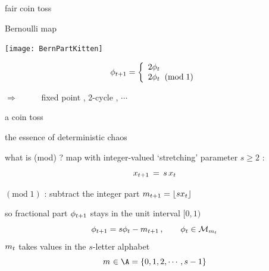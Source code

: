 \begin{frame}{fair coin toss} %
\renewcommand{\ssp}{\ensuremath{\phi}}             %
    \begin{block}{{Bernoulli}  map} %
\begin{center}
            \begin{minipage}[c]{0.36\textwidth}\begin{center}
\texttt{[image: BernPartKitten]}
            \end{center}\end{minipage}
            \hspace{2ex}
            \begin{minipage}[c]{0.46\textwidth}\begin{center}
\[
\ssp_{\zeit+1} =
\left\{ \begin{array}{l} %
        2 \ssp_{\zeit}
                             \\%
        2 \ssp_{\zeit} \;\; (\mbox{mod}\;1)
         \end{array}\right.
\]
            \end{center}\end{minipage}
\end{center}

\hfill $\Rightarrow$~~~~~
fixed point , 2-cycle , $\cdots$
    \end{block}

\bigskip

a 
{coin toss}

\hfill the essence of {\color{blue}deterministic chaos}
\end{frame} %

\begin{frame}{what is ({mod}) ?}
\renewcommand{\ssp}{\ensuremath{x}}             %
map with integer-valued {\color{blue}`stretching' parameter $s\geq2$} :
\[
\ssp_{\zeit+1} \,=\, {s}\,\ssp_{\zeit}
\] %

$(\mbox{mod}\;1)$ :
subtract the integer part
\(
\Ssym{\zeit+1}=\left\lfloor{s}\ssp_{\zeit}\right\rfloor
\)

\renewcommand{\ssp}{\ensuremath{\phi}}             %
so fractional part
$\ssp_{\zeit+1}$ stays in the unit interval $[0,1)$
\[
\ssp_{\zeit+1}
= {s} \ssp_{\zeit} - \Ssym{\zeit+1}
\,,\qquad  \ssp_{\zeit}\in\pS_{\Ssym{\zeit}}
\] %
${m_{t}}$ takes values in the ${s}$-letter alphabet
\[
\Ssym{} \in \A=\{0,1,2,\cdots,s-1\}
\] %
\end{frame} %

